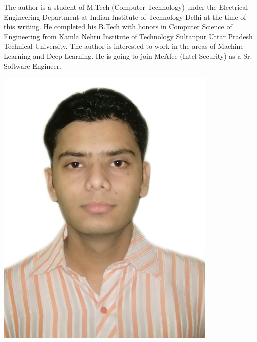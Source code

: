 \documentclass[11pt]{report}
\begin{document}
\begin{minipage}[t]{0.65\linewidth} %
\vspace{0pt} %
The author is a student of M.Tech (Computer Technology) under the Electrical Engineering Department at Indian Institute of Technology Delhi at the time of this writing. He completed his B.Tech with honors in Computer Science of Engineering from Kamla Nehru Institute of Technology Sultanpur Uttar Pradesh Technical University. The author is interested to work in the areas of Machine Learning and Deep Learning. He is going to join McAfee (Intel Security) as a Sr. Software Engineer.
\end{minipage}
\hspace{0.5cm}
\begin{minipage}[t]{0.25\linewidth}
\vspace{0pt} %
  \centering
  \includegraphics[width=\textwidth]{./images/myphoto.png}
\end{minipage}
\end{document}
